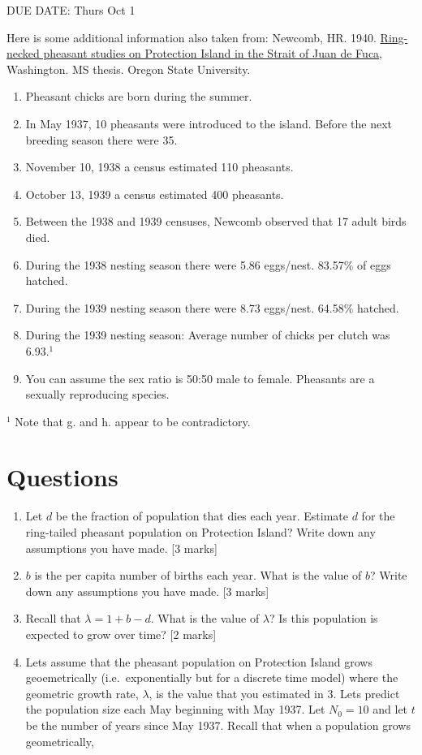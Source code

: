 \documentclass[]{book}
\providecommand{\tightlist}{%
  \setlength{\itemsep}{0pt}\setlength{\parskip}{0pt}}
\begin{document}
DUE DATE: Thurs Oct 1

Here is some additional information also taken from: Newcomb, HR. 1940.
\href{https://ir.library.oregonstate.edu/concern/graduate_thesis_or_dissertations/js956j801?locale=en}{Ring-necked
pheasant studies on Protection Island in the Strait of Juan de Fuca},
Washington. MS thesis. Oregon State University.

\begin{enumerate}
\def\labelenumi{\alph{enumi}.}
\tightlist
\item
  Pheasant chicks are born during the summer.
\item
  In May 1937, 10 pheasants were introduced to the island. Before the
  next breeding season there were 35.
\item
  November 10, 1938 a census estimated 110 pheasants.
\item
  October 13, 1939 a census estimated 400 pheasants.
\item
  Between the 1938 and 1939 censuses, Newcomb observed that 17 adult
  birds died.
\item
  During the 1938 nesting season there were 5.86 eggs/nest. 83.57\% of
  eggs hatched.
\item
  During the 1939 nesting season there were 8.73 eggs/nest. 64.58\%
  hatched.
\item
  During the 1939 nesting season: Average number of chicks per clutch
  was 6.93.\(^1\)
\item
  You can assume the sex ratio is 50:50 male to female. Pheasants are a
  sexually reproducing species.
\end{enumerate}

\(^1\) Note that g. and h. appear to be contradictory.

\section{Questions}\label{questions-5}

\begin{enumerate}
\def\labelenumi{\arabic{enumi}.}
\item
  Let \(d\) be the fraction of population that dies each year. Estimate
  \(d\) for the ring-tailed pheasant population on Protection Island?
  Write down any assumptions you have made. {[}3 marks{]}
\item
  \(b\) is the per capita number of births each year. What is the value
  of \(b\)? Write down any assumptions you have made. {[}3 marks{]}
\item
  Recall that \(\lambda = 1 + b-d\). What is the value of \(\lambda\)?
  Is this population is expected to grow over time? {[}2 marks{]}
\item
  Lets assume that the pheasant population on Protection Island grows
  geoemetrically (i.e.~exponentially but for a discrete time model)
  where the geometric growth rate, \(\lambda\), is the value that you
  estimated in 3. Lets predict the population size each May beginning
  with May 1937. Let \(N_0 = 10\) and let \(t\) be the number of years
  since May 1937. Recall that when a population grows geometrically,
\end{enumerate}
\end{document}
